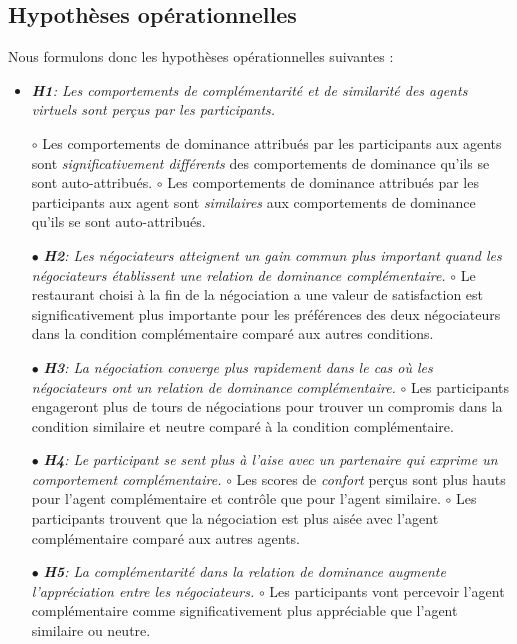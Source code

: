 	\subsection{Hypothèses opérationnelles}
	Nous formulons donc les hypothèses opérationnelles suivantes :
	\begin{itemize}
		\item\textit{\textbf{H1}: Les comportements de complémentarité et de similarité des agents virtuels sont perçus par les participants.}
		
			\subitem $\circ$  Les comportements de dominance attribués par les participants aux agents sont \textit{significativement différents} des comportements de dominance qu'ils se sont auto-attribués.
			\subitem $\circ$ Les comportements de dominance attribués par les participants aux agent sont \textit{similaires} aux comportements de dominance qu'ils se sont auto-attribués.
		
		\item [$\bullet$]\textit{ \textbf{H2}: Les négociateurs atteignent un gain commun plus important quand les négociateurs établissent une relation de dominance complémentaire.}
			\subitem $\circ$ Le restaurant choisi à la fin de la négociation a une valeur de satisfaction  est significativement plus importante pour les préférences des deux négociateurs dans la condition complémentaire comparé aux autres conditions. 
			
		\item [$\bullet$] \textit{\textbf{H3}: La négociation converge plus rapidement dans le cas où les négociateurs ont un relation de dominance complémentaire.}
			\subitem $\circ$ Les participants engageront plus de tours de négociations pour trouver un compromis dans la condition similaire et neutre comparé à la condition complémentaire.
		
		\item [$\bullet$] \textit{\textbf{H4}: Le participant se sent plus à l'aise avec un partenaire qui exprime un comportement complémentaire.}
			\subitem $\circ$ Les scores de \emph{confort} perçus sont plus hauts pour l'agent complémentaire et contrôle que pour l'agent similaire.
			\subitem $\circ$ Les participants trouvent que la négociation est plus aisée avec l'agent complémentaire comparé aux autres agents.
		\item [$\bullet$] \textit{\textbf{H5}: La complémentarité dans la relation de dominance augmente l'appréciation entre les négociateurs.}
			\subitem $\circ$ Les participants vont percevoir l'agent complémentaire comme significativement plus appréciable que l'agent similaire ou neutre.
		
	\end{itemize}
	
